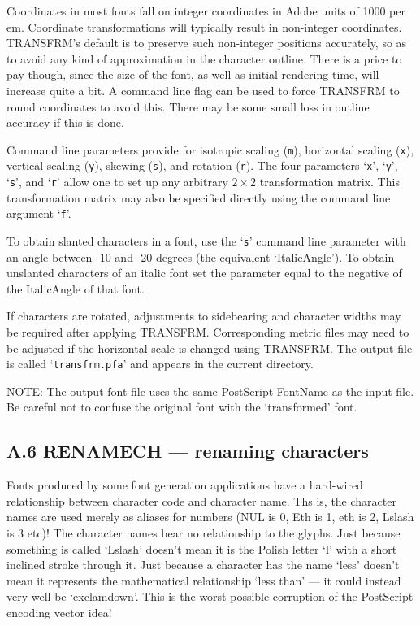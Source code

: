 Coordinates in most fonts fall on integer coordinates in
Adobe units of 1000 per em.
Coordinate transformations will typically result in non-integer coordinates.
TRANSFRM's default is to preserve such non-integer positions accurately,
so as to avoid any kind of approximation in the character outline.
There is a price to pay though, since the size of the font, as well as
initial rendering time, will increase quite a bit.
A command line flag can be used to force TRANSFRM to round coordinates 
to avoid this. %
There may be some small loss in outline accuracy if this is done.

Command line parameters provide for isotropic scaling ({\tt m}), 
horizontal scaling ({\tt x}), vertical scaling ({\tt y}),
skewing ({\tt s}), and rotation ({\tt r}).
The four parameters `{\tt x}', `{\tt y}', `{\tt s}', and `{\tt r}'
allow one to set up any arbitrary $2\times2$ transformation matrix.
This transformation matrix may also be specified directly
using the command line argument `{\tt f}'.

To obtain slanted characters in a font, use the `{\tt s}'
command line parameter with an angle between -10 and -20 degrees
(the equivalent `ItalicAngle').
To obtain unslanted characters of an italic font set the parameter
equal to the negative of the ItalicAngle of that font.

If characters are rotated, adjustments to sidebearing and character widths
may be required after applying TRANSFRM.
Corresponding metric files may need to be adjusted if the horizontal scale
is changed using TRANSFRM.
%
The output file is called `{\tt transfrm.pfa}' and appears
in the current directory. 

NOTE: The output font file uses the same Post\-Script Font\-Name 
as the input file.  Be careful not to confuse the original
font with the `transformed' font.


\subsection{A.6 RENAMECH --- renaming characters} 

Fonts produced by some font generation applications have a hard-wired
relationship between character code and character name.
Ths is, the character names are used merely as
aliases for numbers (NUL is 0, Eth is 1, eth is 2, Lslash is 3 etc)!
The character names bear no relationship to the glyphs.  
Just because something is called `Lslash' doesn't mean it is the Polish
letter `l' with a short inclined stroke through it.  Just because a character
has the name `less' doesn't mean it represents the mathematical
relationship `less than' --- it could instead very well be `exclamdown'.  
This is the worst possible corruption of the PostScript encoding vector idea!


